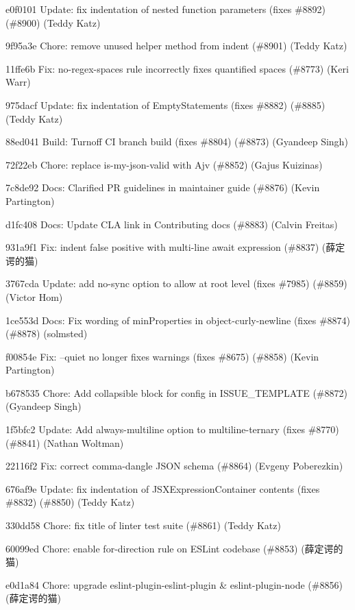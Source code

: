 \begin{DoxyItemize}
\item e0f0101 Update\+: fix indentation of nested function parameters (fixes \#8892) (\#8900) (Teddy Katz)
\item 9f95a3e Chore\+: remove unused helper method from {\ttfamily indent} (\#8901) (Teddy Katz)
\item 11ffe6b Fix\+: no-\/regex-\/spaces rule incorrectly fixes quantified spaces (\#8773) (Keri Warr)
\item 975dacf Update\+: fix indentation of Empty\+Statements (fixes \#8882) (\#8885) (Teddy Katz)
\item 88ed041 Build\+: Turnoff CI branch build (fixes \#8804) (\#8873) (Gyandeep Singh)
\item 72f22eb Chore\+: replace is-\/my-\/json-\/valid with Ajv (\#8852) (Gajus Kuizinas)
\item 7c8de92 Docs\+: Clarified PR guidelines in maintainer guide (\#8876) (Kevin Partington)
\item d1fc408 Docs\+: Update CLA link in Contributing docs (\#8883) (Calvin Freitas)
\item 931a9f1 Fix\+: indent false positive with multi-\/line await expression (\#8837) (薛定谔的猫)
\item 3767cda Update\+: add no-\/sync option to allow at root level (fixes \#7985) (\#8859) (Victor Hom)
\item 1ce553d Docs\+: Fix wording of min\+Properties in object-\/curly-\/newline (fixes \#8874) (\#8878) (solmsted)
\item f00854e Fix\+: --quiet no longer fixes warnings (fixes \#8675) (\#8858) (Kevin Partington)
\item b678535 Chore\+: Add collapsible block for config in ISSUE\+\_\+\+TEMPLATE (\#8872) (Gyandeep Singh)
\item 1f5bfc2 Update\+: Add always-\/multiline option to multiline-\/ternary (fixes \#8770) (\#8841) (Nathan Woltman)
\item 22116f2 Fix\+: correct comma-\/dangle JSON schema (\#8864) (Evgeny Poberezkin)
\item 676af9e Update\+: fix indentation of JSXExpression\+Container contents (fixes \#8832) (\#8850) (Teddy Katz)
\item 330dd58 Chore\+: fix title of linter test suite (\#8861) (Teddy Katz)
\item 60099ed Chore\+: enable for-\/direction rule on ESLint codebase (\#8853) (薛定谔的猫)
\item e0d1a84 Chore\+: upgrade eslint-\/plugin-\/eslint-\/plugin \& eslint-\/plugin-\/node (\#8856) (薛定谔的猫)

\end{DoxyItemize}
